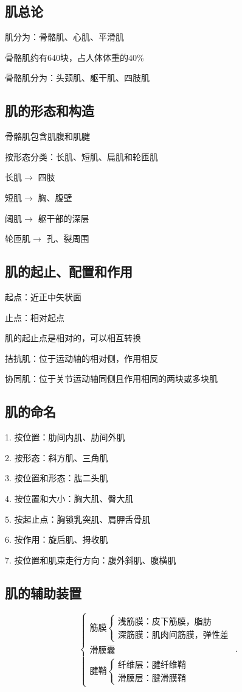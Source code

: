 \subsection{肌总论}%
\label{sub:肌总论}
肌分为：骨骼肌、心肌、平滑肌

骨骼肌约有640块，占人体体重的40\%

骨骼肌分为：头颈肌、躯干肌、四肢肌
\subsection{肌的形态和构造}%
\label{sub:肌的形态和构造}
\begin{notation}
	骨骼肌包含肌腹和肌腱
\end{notation}
按形态分类：长肌、短肌、扁肌和轮匝肌

长肌$\to $ 四肢

短肌$\to $ 胸、腹壁

阔肌$\to $ 躯干部的深层

轮匝肌$\to $ 孔、裂周围
\subsection{肌的起止、配置和作用}%
\label{sub:肌的起止、配置和作用}
起点：近正中矢状面

止点：相对起点
\begin{notation}
	肌的起止点是相对的，可以相互转换
\end{notation}
拮抗肌：位于运动轴的相对侧，作用相反

协同肌：位于关节运动轴同侧且作用相同的两块或多块肌
\subsection{肌的命名}%
\label{sub:肌的命名}
1. 按位置：肋间内肌、肋间外肌

2. 按形态：斜方肌、三角肌

3. 按位置和形态：肱二头肌

4. 按位置和大小：胸大肌、臀大肌

5. 按起止点：胸锁乳突肌、肩胛舌骨肌

6. 按作用：旋后肌、拇收肌

7. 按位置和肌束走行方向：腹外斜肌、腹横肌
\subsection{肌的辅助装置}%
\label{sub:肌的辅助装置}
\[
	\begin{cases}
		\text{筋膜}\begin{cases}
			\text{浅筋膜：皮下筋膜，脂肪}\\
			\text{深筋膜：肌肉间筋膜，弹性差}
		\end{cases}\\
		\text{滑膜囊}\\
		\text{腱鞘}\begin{cases}
		    \text{纤维层：腱纤维鞘}\\
            \text{滑膜层：腱滑膜鞘}
		\end{cases}
	\end{cases}
.\] 
